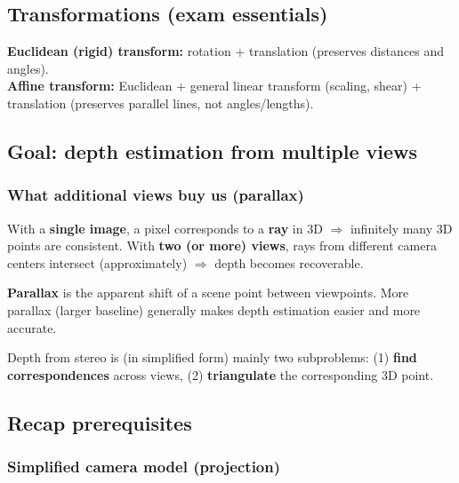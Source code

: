 \documentclass[11pt,a4paper]{article}
\begin{document}
\subsection{Transformations (exam essentials)}
\begin{notebox}
\textbf{Euclidean (rigid) transform:} rotation + translation (preserves distances and angles).\\
\textbf{Affine transform:} Euclidean + general linear transform (scaling, shear) + translation (preserves parallel lines, not angles/lengths).
\end{notebox}

\subsection{Goal: depth estimation from multiple views}
\subsubsection{What additional views buy us (parallax)}

\begin{intbox}
With a \textbf{single image}, a pixel corresponds to a \textbf{ray} in 3D $\Rightarrow$ infinitely many 3D points are consistent.
With \textbf{two (or more) views}, rays from different camera centers intersect (approximately) $\Rightarrow$ depth becomes recoverable.
\end{intbox}

\begin{defbox}
\textbf{Parallax} is the apparent shift of a scene point between viewpoints.
More parallax (larger baseline) generally makes depth estimation easier and more accurate.
\end{defbox}

\begin{notebox}
Depth from stereo is (in simplified form) mainly two subproblems:
(1) \textbf{find correspondences} across views, (2) \textbf{triangulate} the corresponding 3D point.
\end{notebox}

\subsection{Recap prerequisites}

\subsubsection{Simplified camera model (projection)}
\end{document}
